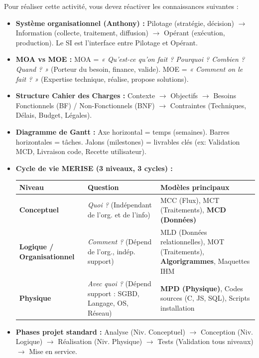 \documentclass[11pt]{article}
\newcounter{popsec}
\newcounter{popsub}
\newcommand{\courssub}[1]{%
  \stepcounter{popsub}%
  \par\vspace{9pt}\noindent{\popxbold\fontsize{11.5}{13}\selectfont\color{popink}{\color{poporange}\thepopsec.\thepopsub}\hspace{6pt}#1}\par\nopagebreak\vspace{4pt}
}
\begin{document}
\courssub{Ressources à mobiliser}
Pour réaliser cette activité, vous devez réactiver les connaissances suivantes :
\begin{itemize}
    \item \textbf{Système organisationnel (Anthony) :} Pilotage (stratégie, décision) $\rightarrow$ Information (collecte, traitement, diffusion) $\rightarrow$ Opérant (exécution, production). Le SI est l'interface entre Pilotage et Opérant.
    \item \textbf{MOA vs MOE :} MOA = \emph{« Qu'est-ce qu'on fait ? Pourquoi ? Combien ? Quand ? »} (Porteur du besoin, finance, valide). MOE = \emph{« Comment on le fait ? »} (Expertise technique, réalise, propose solutions).
    \item \textbf{Structure Cahier des Charges :} Contexte $\rightarrow$ Objectifs $\rightarrow$ Besoins Fonctionnels (BF) / Non-Fonctionnels (BNF) $\rightarrow$ Contraintes (Techniques, Délais, Budget, Légales).
    \item \textbf{Diagramme de Gantt :} Axe horizontal = temps (semaines). Barres horizontales = tâches. Jalons (milestones) = livrables clés (ex: Validation MCD, Livraison code, Recette utilisateur).
    \item \textbf{Cycle de vie MERISE (3 niveaux, 3 cycles) :}
    \begin{center}
    \begin{tabularx}{\linewidth}{|l|X|X|}\hline
    \rowcolor{popblueL}
    \textbf{Niveau} & \textbf{Question} & \textbf{Modèles principaux} \\\hline
    \textbf{Conceptuel} & \emph{Quoi ?} (Indépendant de l'org. et de l'info) & MCC (Flux), MCT (Traitements), \textbf{MCD (Données)} \\\hline
    \textbf{Logique / Organisationnel} & \emph{Comment ?} (Dépend de l'org., indép. support) & MLD (Données relationnelles), MOT (Traitements), \textbf{Algorigrammes}, Maquettes IHM \\\hline
    \textbf{Physique} & \emph{Avec quoi ?} (Dépend support : SGBD, Langage, OS, Réseau) & \textbf{MPD (Physique)}, Codes sources (C, JS, SQL), Scripts installation \\\hline
    \end{tabularx}
    \end{center}
    \item \textbf{Phases projet standard :} Analyse (Niv. Conceptuel) $\rightarrow$ Conception (Niv. Logique) $\rightarrow$ Réalisation (Niv. Physique) $\rightarrow$ Tests (Validation tous niveaux) $\rightarrow$ Mise en service.
\end{itemize}
\end{document}
